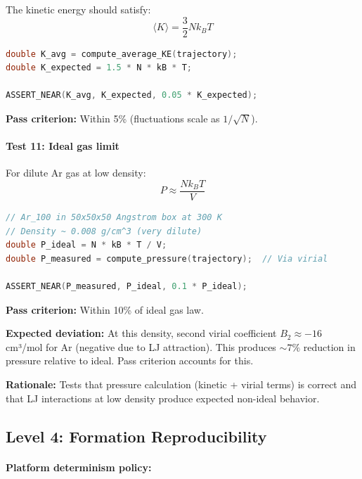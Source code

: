 \documentclass[11pt]{article}
\begin{document}
The kinetic energy should satisfy:
\begin{equation}
\langle K \rangle = \frac{3}{2} N k_B T
\end{equation}

\begin{lstlisting}[language=C++]
double K_avg = compute_average_KE(trajectory);
double K_expected = 1.5 * N * kB * T;

ASSERT_NEAR(K_avg, K_expected, 0.05 * K_expected);
\end{lstlisting}

\textbf{Pass criterion:} Within 5\% (fluctuations scale as $1/\sqrt{N}$).

\paragraph{Test 11: Ideal gas limit}

For dilute Ar gas at low density:
\begin{equation}
P \approx \frac{N k_B T}{V}
\end{equation}

\begin{lstlisting}[language=C++]
// Ar_100 in 50x50x50 Angstrom box at 300 K
// Density ~ 0.008 g/cm^3 (very dilute)
double P_ideal = N * kB * T / V;
double P_measured = compute_pressure(trajectory);  // Via virial

ASSERT_NEAR(P_measured, P_ideal, 0.1 * P_ideal);
\end{lstlisting}

\textbf{Pass criterion:} Within 10\% of ideal gas law.

\textbf{Expected deviation:} At this density, second virial coefficient $B_2 \approx -16$ cm³/mol for Ar (negative due to LJ attraction). This produces $\sim 7\%$ reduction in pressure relative to ideal. Pass criterion accounts for this.

\textbf{Rationale:} Tests that pressure calculation (kinetic + virial terms) is correct and that LJ interactions at low density produce expected non-ideal behavior.

\subsection{Level 4: Formation Reproducibility}

\paragraph{Platform determinism policy:}
\end{document}
